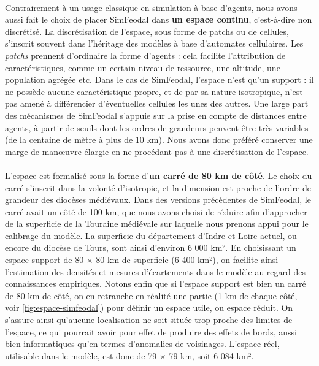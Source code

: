 \paragraph[Continu]{}Contrairement à un usage classique en simulation à base d'agents, nous avons aussi fait le choix de placer SimFeodal dans \textbf{un espace continu}, c'est-à-dire non discrétisé. La discrétisation de l'espace, sous forme de \og patchs\fg{} ou de \og cellules\fg{}, s'inscrit souvent dans l'héritage des modèles à base d'automates cellulaires. Les \textit{patchs} prennent d'ordinaire la forme d'agents : cela facilite l'attribution de caractéristiques, comme un certain niveau de ressource, une altitude, une population agrégée etc.
Dans le cas de SimFeodal, l'espace n'est qu'un support : il ne possède aucune caractéristique propre, et de par sa nature isotropique, n'est pas amené à différencier d'éventuelles cellules les unes des autres.
Une large part des mécanismes de SimFeodal s'appuie sur la prise en compte de distances entre agents, à partir de seuils dont les ordres de grandeurs peuvent être très variables (de la centaine de mètre à plus de 10 km).
Nous avons donc préféré conserver une marge de manœuvre élargie en ne procédant pas à une discrétisation de l'espace.

\paragraph[Dimension]{}L'espace est formalisé sous la forme d'\textbf{un carré de 80 km de côté}. Le choix du carré s'inscrit dans la volonté d'isotropie, et la dimension est proche de l'ordre de grandeur des diocèses médiévaux.
Dans des versions précédentes de SimFeodal, le carré avait un côté de 100 km, que nous avons choisi de réduire afin d'approcher de la superficie de la Touraine médiévale sur laquelle nous prenons appui pour le calibrage du modèle. La superficie du département d'Indre-et-Loire actuel, ou encore du diocèse de Tours, sont ainsi d'environ 6 000 km². En choisissant un espace support de 80 $\times$ 80 km de superficie (6 400 km²), on facilite ainsi l'estimation des densités et mesures d'écartements dans le modèle au regard des connaissances empiriques.
Notons enfin que si l'espace support est bien un carré de 80 km de côté, on en retranche en réalité une partie (1 km de chaque côté, voir \cref{fig:espace-simfeodal}) pour définir un espace utile, ou \og espace réduit\fg{}. On s'assure ainsi qu'aucune localisation ne soit située trop proche des limites de l'espace, ce qui pourrait avoir pour effet de produire des \og effets de bords\fg{}, aussi bien informatiques qu'en termes d'anomalies de voisinages.
L'espace réel, utilisable dans le modèle, est donc de 79 $\times$ 79 km, soit 6 084 km².

